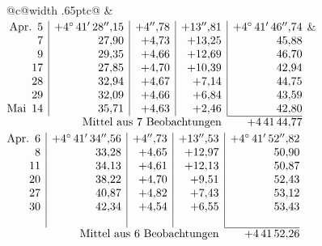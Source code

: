 \noindent\begin{tabular}{@{}c@{\hspace{.4em}\vrule width .65pt\hspace{.4em}}c@{}}
 &
 \\[.18ex]
\(\begin{array}[t]{@{}r|r|r|r|r@{}}
\text{Apr.}\enspace 5 & +4^\circ\,41'\,28''{,}15 & +4''{,}78 & +13''{,}81 & +4^\circ\,41'\,46''{,}74\\
7 & 27{,}90 & +4{,}73 & +13{,}25 & 45{,}88\\
9 & 29{,}35 & +4{,}66 & +12{,}69 & 46{,}70\\
17 & 27{,}85 & +4{,}70 & +10{,}39 & 42{,}94\\
28 & 32{,}94 & +4{,}67 & +7{,}14 & 44{,}75\\
29 & 32{,}09 & +4{,}66 & +6{,}84 & 43{,}59\\
\text{Mai}\enspace 14 & 35{,}71 & +4{,}63 & +2{,}46 & 42{,}80\\
\cline{5-5}
\multicolumn{4}{r}{\text{Mittel aus 7 Beobachtungen}} & +4\,41\,44{,}77
\end{array}\)
&
\(\begin{array}[t]{@{}r|r|r|r|r@{}}
\text{Apr.}\enspace 6 & +4^\circ\,41'\,34''{,}56 & +4''{,}73 & +13''{,}53 & +4^\circ\,41'\,52''{,}82\\
8 & 33{,}28 & +4{,}65 & +12{,}97 & 50{,}90\\
11 & 34{,}13 & +4{,}61 & +12{,}13 & 50{,}87\\
20 & 38{,}22 & +4{,}70 & +9{,}51 & 52{,}43\\
27 & 40{,}87 & +4{,}82 & +7{,}43 & 53{,}12\\
30 & 42{,}34 & +4{,}54 & +6{,}55 & 53{,}43\\
 & & & & \\
\cline{5-5}
\multicolumn{4}{r}{\text{Mittel aus 6 Beobachtungen}} & +4\,41\,52{,}26
\end{array}\)
\end{tabular}\par\medskip
